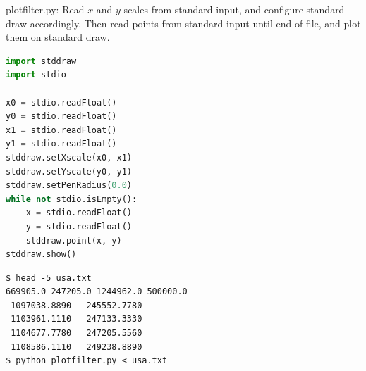 \documentclass[8pt,a4paper,compress]{beamer}
\begin{document}
\begin{frame}[fragile]
\pause

\begin{framed}
\tiny plotfilter.py: Read $x$ and $y$ scales from standard input, and configure standard draw accordingly. Then read points from standard input until end-of-file, and plot them on standard draw.
\end{framed}

\begin{lstlisting}[language=Python]
import stddraw
import stdio

x0 = stdio.readFloat()
y0 = stdio.readFloat()
x1 = stdio.readFloat()
y1 = stdio.readFloat()
stddraw.setXscale(x0, x1)
stddraw.setYscale(y0, y1)
stddraw.setPenRadius(0.0)
while not stdio.isEmpty():
    x = stdio.readFloat()
    y = stdio.readFloat()
    stddraw.point(x, y)
stddraw.show()
\end{lstlisting}

\pause

\begin{minipage}{150pt}
\begin{lstlisting}[language={}]
$ head -5 usa.txt 
669905.0 247205.0 1244962.0 500000.0
 1097038.8890   245552.7780
 1103961.1110   247133.3330
 1104677.7780   247205.5560
 1108586.1110   249238.8890
$ python plotfilter.py < usa.txt
\end{lstlisting}
\end{minipage}%
\begin{minipage}{150pt}
\hfill {}
\end{minipage}
\end{frame}
\end{document}
